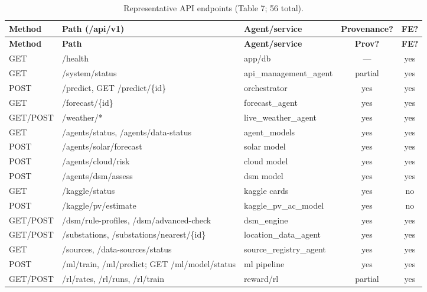 \documentclass[11pt,a4paper]{article}
\newcommand{\yes}{\textcolor{cok}{yes}}
\newcommand{\no}{\textcolor{cmiss}{no}}
\begin{document}
\begin{footnotesize}
\begin{longtable}{@{}l p{5.3cm}p{2.4cm}c c@{}}
\caption{Representative API endpoints (Table 7; 56 total).}\label{tab:api}\\
\toprule
\textbf{Method} & \textbf{Path (/api/v1)} & \textbf{Agent/service} & \textbf{Provenance?} & \textbf{FE?}\\
\midrule\endfirsthead
\toprule \textbf{Method} & \textbf{Path} & \textbf{Agent/service} & \textbf{Prov?} & \textbf{FE?}\\ \midrule\endhead
\bottomrule\endfoot
GET & /health & app/db & --- & \yes\\
GET & /system/status & api\_management\_agent & partial & \yes\\
POST & /predict, GET /predict/\{id\} & orchestrator & \yes & \yes\\
GET & /forecast/\{id\} & forecast\_agent & \yes & \yes\\
GET/POST & /weather/* & live\_weather\_agent & \yes & \yes\\
GET & /agents/status, /agents/data-status & agent\_models & \yes & \yes\\
POST & /agents/solar/forecast & solar model & \yes & \yes\\
POST & /agents/cloud/risk & cloud model & \yes & \yes\\
POST & /agents/dsm/assess & dsm model & \yes & \yes\\
GET & /kaggle/status & kaggle cards & \yes & \no\\
POST & /kaggle/pv/estimate & kaggle\_pv\_ac\_model & \yes & \no\\
GET/POST & /dsm/rule-profiles, /dsm/advanced-check & dsm\_engine & \yes & \yes\\
GET/POST & /substations, /substations/nearest/\{id\} & location\_data\_agent & \yes & \yes\\
GET & /sources, /data-sources/status & source\_registry\_agent & \yes & \yes\\
POST & /ml/train, /ml/predict; GET /ml/model/status & ml pipeline & \yes & \yes\\
GET/POST & /rl/rates, /rl/runs, /rl/train & reward/rl & partial & \yes\\
\end{longtable}
\end{footnotesize}

\end{document}
